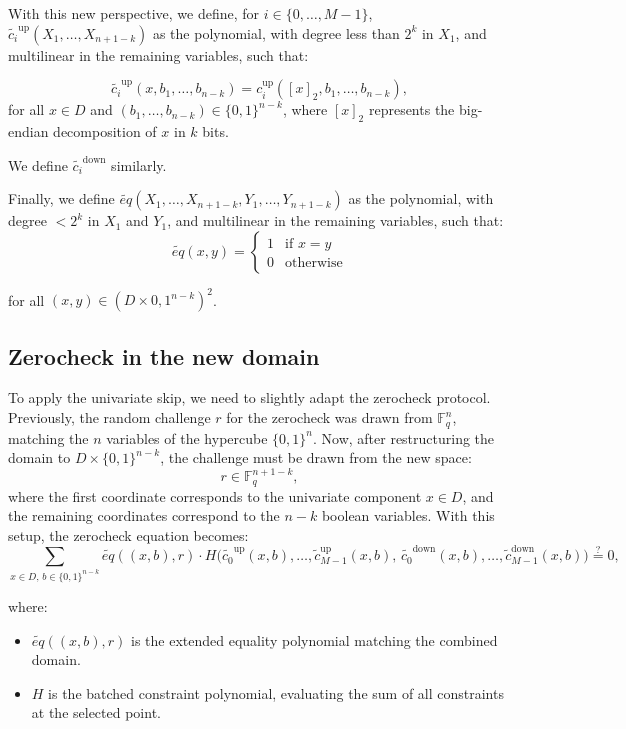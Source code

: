 \documentclass{article}
\newcommand{\Fq}{\mathbb F_q}
\begin{document}
With this new perspective, we define, for $i \in \{0, \dots, M -1 \}$, $\widetilde{c_i}^{\text{up}}(X_1, \dots, X_{n + 1 - k})$ as the polynomial, with degree less than $ 2^k$ in $X_1$, and multilinear in the remaining variables, such that:

$$\widetilde{c_i}^{\text{up}}(x, b_1, \dots , b_{n - k}) = c_i^{\text{up}}([x]_2, b_1, \dots , b_{n - k}),$$
for all $x \in D$ and $(b_1, \dots, b_{n  - k}) \in \{0, 1\}^{n - k}$, where $[x]_2$ represents the big-endian decomposition of $x$ in $k$ bits.

\vspace{\baselineskip}

We define $\widetilde{c_i}^{\text{down}}$ similarly.


\vspace{\baselineskip}

Finally, we define $\widetilde{eq}(X_1, \dots, X_{n + 1 - k}, Y_1, \dots, Y_{n + 1 - k})$ as the polynomial, with degree $< 2^k$ in $X_1$ and $Y_1$, and multilinear in the remaining variables, such that:
$$
\widetilde{eq}(x, y) = 
\begin{cases}
1 & \text{if } x = y \\
0 & \text{otherwise}
\end{cases}
$$

for all $(x, y) \in (D \times {0,1}^{n - k})^2$.


\subsection{Zerocheck in the new domain}

To apply the univariate skip, we need to slightly adapt the zerocheck protocol. Previously, the random challenge $r$ for the zerocheck was drawn from $\Fq^n$, matching the $n$ variables of the hypercube $\{0,1\}^n$. Now, after restructuring the domain to $D \times \{0,1\}^{n - k}$, the challenge must be drawn from the new space:
$$
r \in \Fq^{n + 1 - k},
$$
where the first coordinate corresponds to the univariate component $x \in D$, and the remaining coordinates correspond to the $n - k$ boolean variables. With this setup, the zerocheck equation becomes:
$$
\sum_{x \in D,\, b \in \{0,1\}^{n - k}} \widetilde{eq}((x, b), r) \cdot H\big(\widetilde{c_0}^{\text{up}}(x, b), \dots, \widetilde{c}_{M-1}^{\text{up}}(x, b),\, \widetilde{c_0}^{\text{down}}(x, b), \dots, \widetilde{c}_{M-1}^{\text{down}}(x, b)\big) \stackrel{?}{=} 0,
$$

where:
\begin{itemize}
    \item $\widetilde{eq}((x, b), r)$ is the extended equality polynomial matching the combined domain.
    \item $H$ is the batched constraint polynomial, evaluating the sum of all constraints at the selected point.
\end{itemize}
\end{document}
